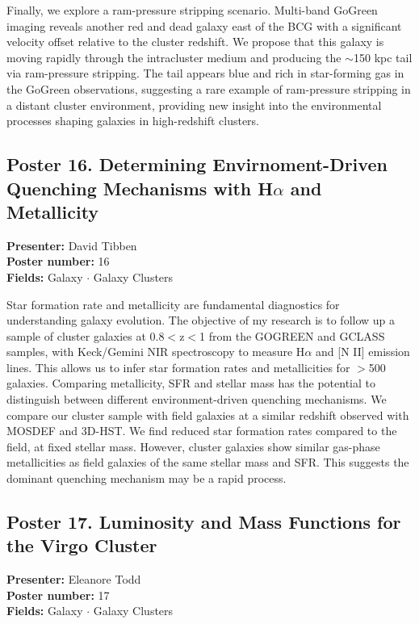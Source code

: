 Finally, we explore a ram-pressure stripping scenario. Multi-band GoGreen imaging reveals another red and dead galaxy east of the BCG with a significant velocity offset relative to the cluster redshift. We propose that this galaxy is moving rapidly through the intracluster medium and producing the $\sim$150 kpc tail via ram-pressure stripping. The tail appears blue and rich in star-forming gas in the GoGreen observations, suggesting a rare example of ram-pressure stripping in a distant cluster environment, providing new insight into the environmental processes shaping galaxies in high-redshift clusters.

\hypertarget{poster-abstract-talk-245}{}\label{poster-abstract-page-talk-245}
\subsection*{Poster 16. Determining Envirnoment-Driven Quenching Mechanisms with H$\alpha$ and Metallicity}
\textbf{Presenter:} David Tibben\\
\textbf{Poster number:} 16\\
\textbf{Fields:} Galaxy $\cdot$ Galaxy Clusters

Star formation rate and metallicity are fundamental diagnostics for understanding galaxy evolution. The objective of my research is to follow up a sample of cluster galaxies at 0.8$<$z$<$1 from the GOGREEN and GCLASS samples, with Keck/Gemini NIR spectroscopy to measure H$\alpha$ and [N II] emission lines. This allows us to infer star formation rates and metallicities for $>$500 galaxies. Comparing metallicity, SFR and stellar mass has the potential to distinguish between different environment-driven quenching mechanisms. We compare our cluster sample with field galaxies at a similar redshift observed with MOSDEF and 3D-HST. We find reduced star formation rates compared to the field, at fixed stellar mass. However, cluster galaxies show similar gas-phase metallicities as field galaxies of the same stellar mass and SFR. This suggests the dominant quenching mechanism may be a rapid process.

\hypertarget{poster-abstract-talk-61}{}\label{poster-abstract-page-talk-61}
\subsection*{Poster 17. Luminosity and Mass Functions for the Virgo Cluster}
\textbf{Presenter:} Eleanore Todd\\
\textbf{Poster number:} 17\\
\textbf{Fields:} Galaxy $\cdot$ Galaxy Clusters

